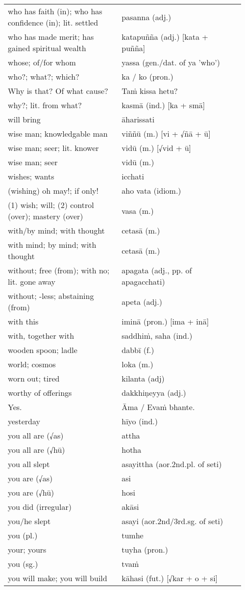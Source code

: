 \documentclass[a5paper]{memoir}
\begin{document}
\begin{longtable}{L{0.48\linewidth} L{0.48\linewidth} H}
who has faith (in); who has confidence (in); lit. settled & pasanna (adj.) & \\
who has made merit; has gained spiritual wealth & katapuñña (adj.) [kata + puñña] & \\
whose; of/for whom & yassa (gen./dat. of ya 'who') & \\
who?; what?; which? & ka / ko (pron.) & \\
Why is that? Of what cause? & Taṁ kissa hetu? & \\
why?; lit. from what? & kasmā (ind.) [ka + smā] & \\
will bring & āharissati & \\
wise man; knowledgable man & viññū (m.) [vi + √ñā + ū] & \\
wise man; seer; lit. knower & vidū (m.) [√vid + ū] & \\
wise man; seer & vidū (m.) & \\
wishes; wants & icchati & \\
(wishing) oh may!; if only! & aho vata (idiom.) & \\
(1) wish; will; (2) control (over); mastery (over) & vasa (m.) & \\
with/by mind; with thought & cetasā (m.) & \\
with mind; by mind; with thought & cetasā (m.) & \\
without; free (from); with no; lit. gone away & apagata (adj., pp. of apagacchati) & \\
without; -less; abstaining (from) & apeta (adj.) & \\
with this & iminā (pron.) [ima + inā] & \\
with, together with & saddhiṁ, saha (ind.) & \\
wooden spoon; ladle & dabbī (f.) & \\
world; cosmos & loka (m.) & \\
worn out; tired & kilanta (adj) & \\
worthy of offerings & dakkhiṇeyya (adj.) & \\
Yes. & Āma / Evaṁ bhante. & \\
yesterday & hīyo (ind.) & \\
you all are (√as) & attha & \\
you all are (√hū) & hotha & \\
you all slept & asayittha (aor.2nd.pl. of seti) & \\
you are (√as) & asi & \\
you are (√hū) & hosi & \\
you did (irregular) & akāsi & \\
you/he slept & asayi (aor.2nd/3rd.sg. of seti) & \\
you (pl.) & tumhe & \\
your; yours & tuyha (pron.) & \\
you (sg.) & tvaṁ & \\
you will make; you will build & kāhasi (fut.) [√kar + o + si] & \\
\end{longtable}
\end{document}
